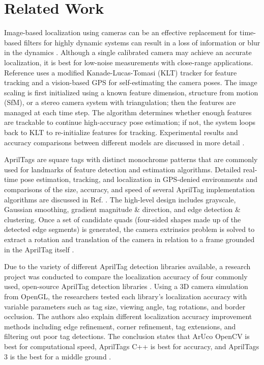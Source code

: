 \documentclass[conference]{IEEEtran}
\begin{document}
\section{Related Work}

Image-based localization using cameras can be an effective replacement for time-based filters for highly dynamic systems can result in a loss of information or blur in the dynamics \cite{mair2009efficient}. 
Although a single calibrated camera may achieve an accurate localization, it is best for low-noise measurements with close-range applications.
Reference \cite{mair2009efficient} uses a modified Kanade-Lucas-Tomasi (KLT) tracker for feature tracking and a vision-based GPS for self-estimating the camera poses. 
The image scaling is first initialized using a known feature dimension, structure from motion (SfM), or a stereo camera system with triangulation; then the features are managed at each time step. The algorithm determines whether enough features are trackable to continue high-accuracy pose estimation; if not, the system loops back to KLT to re-initialize features for tracking. 
Experimental results and accuracy comparisons between different models are discussed in more detail \cite{mair2009efficient}.

AprilTags are square tags with distinct monochrome patterns that are commonly used for landmarks of feature detection and estimation algorithms. 
Detailed real-time pose estimation, tracking, and localization in GPS-denied environments and comparisons of the size, accuracy, and speed of several AprilTag implementation algorithms are discussed in Ref. \cite{tola2021real}. 
The high-level design includes grayscale, Gaussian smoothing, gradient magnitude \& direction, and edge detection \& clustering. 
Once a set of candidate quads (four-sided shapes made up of the detected edge segments) is generated, the camera extrinsics problem is solved to extract a rotation and translation of the camera in relation to a frame grounded in the AprilTag itself \cite{olson2011apriltag}. 

Due to the variety of different AprilTag detection libraries available, a research project was conducted to compare the localization accuracy of four commonly used, open-source AprilTag detection libraries \cite{kallwies2020determining}. 
Using a 3D camera simulation from OpenGL, the researchers tested each library's localization accuracy with variable parameters such as tag size, viewing angle, tag rotations, and border occlusion. The authors also explain different localization accuracy improvement methods including edge refinement, corner refinement, tag extensions, and filtering out poor tag detections. 
The conclusion states that ArUco OpenCV is best for computational speed, AprilTags C++ is best for accuracy, and AprilTags 3 is the best for a middle ground \cite{kallwies2020determining}. 
\end{document}
